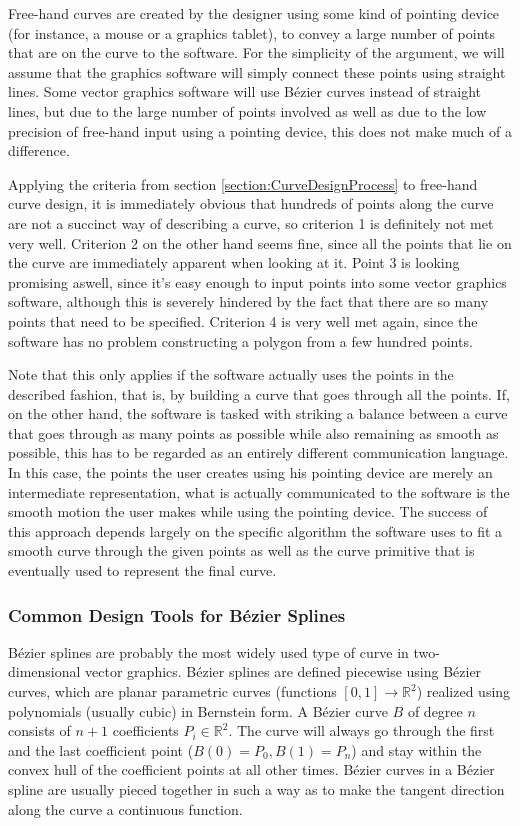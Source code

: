 \documentclass[a4paper]{article}
\begin{document}
				Free-hand curves are created by the designer using some kind of pointing device (for instance, a mouse or a graphics tablet), to convey a large number of points that are on the curve to the software. For the simplicity of the argument, we will assume that the graphics software will simply connect these points using straight lines. Some vector graphics software will use Bézier curves instead of straight lines, but due to the large number of points involved as well as due to the low precision of free-hand input using a pointing device, this does not make much of a difference.

				Applying the criteria from section \ref{section:CurveDesignProcess} to free-hand curve design, it is immediately obvious that hundreds of points along the curve are not a succinct way of describing a curve, so criterion 1 is definitely not met very well. Criterion 2 on the other hand seems fine, since all the points that lie on the curve are immediately apparent when looking at it. Point 3 is looking promising aswell, since it's easy enough to input points into some vector graphics software, although this is severely hindered by the fact that there are so many points that need to be specified. Criterion 4 is very well met again, since the software has no problem constructing a polygon from a few hundred points.

				Note that this only applies if the software actually uses the points in the described fashion, that is, by building a curve that goes through all the points. If, on the other hand, the software is tasked with striking a balance between a curve that goes through as many points as possible while also remaining as smooth as possible, this has to be regarded as an entirely different communication language. In this case, the points the user creates using his pointing device are merely an intermediate representation, what is actually communicated to the software is the smooth motion the user makes while using the pointing device. The success of this approach depends largely on the specific algorithm the software uses to fit a smooth curve through the given points as well as the curve primitive that is eventually used to represent the final curve.

			\subsubsection{Common Design Tools for Bézier Splines}

				Bézier splines are probably the most widely used type of curve in two-dimensional vector graphics. Bézier splines are defined piecewise using Bézier curves, which are planar parametric curves (functions \(\left[0,1\right] \rightarrow \mathbb{R}^2\)) realized using polynomials (usually cubic) in Bernstein form. A Bézier curve \(B\) of degree \(n\) consists of \(n + 1\) coefficients \(P_i \in \mathbb{R}^2\). The curve will always go through the first and the last coefficient point (\(B\left(0\right) = P_0, B\left(1\right) = P_n\)) and stay within the convex hull of the coefficient points at all other times. Bézier curves in a Bézier spline are usually pieced together in such a way as to make the tangent direction along the curve a continuous function.
\end{document}
